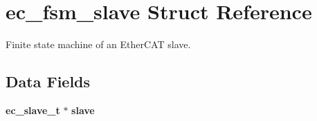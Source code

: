 \section{ec\-\_\-fsm\-\_\-slave Struct Reference}
\label{structec__fsm__slave}


Finite state machine of an Ether\-C\-A\-T slave.  


\subsection*{Data Fields}
\begin{DoxyCompactItemize}
\item 
{\bf ec\-\_\-slave\-\_\-t} $\ast$ {\bf slave}\label{structec__fsm__slave_aa94f51d82b6c14baa831f68999fbc6a7}


\end{DoxyCompactItemize}
